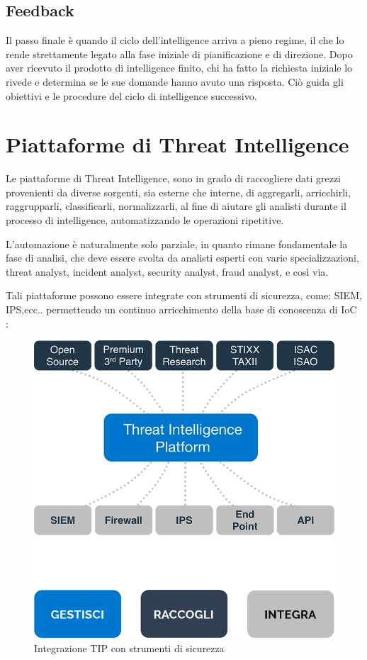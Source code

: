   
    
\subsection{Feedback}


Il passo finale è quando il ciclo dell'intelligence arriva a pieno regime, il che lo rende strettamente legato alla fase iniziale di pianificazione e di direzione. 
Dopo aver ricevuto il prodotto di intelligence finito, chi ha fatto la richiesta iniziale lo rivede e determina se le sue domande hanno avuto una risposta. 
Ciò guida gli obiettivi e le procedure del ciclo di intelligence successivo.

\section{Piattaforme di Threat Intelligence}
\label{sec:Piattaforme di Threat Intelligence}

Le piattaforme di Threat Intelligence, sono in grado di raccogliere dati grezzi provenienti da diverse sorgenti, sia esterne che interne, di aggregarli, arricchirli, raggrupparli, classificarli, normalizzarli, al fine di aiutare gli analisti durante il processo di intelligence, automatizzando le operazioni ripetitive.\par
L’automazione è naturalmente solo parziale, in quanto rimane fondamentale la fase di analisi, che deve essere svolta da analisti esperti con varie specializzazioni, threat analyst, incident analyst, security analyst, fraud analyst, e così via.

\newpage

Tali piattaforme possono essere integrate con strumenti di sicurezza, come: SIEM, IPS,ecc.. permettendo un continuo arricchimento della base di conoscenza di IoC  : 

 \begin{figure}[h]
    \begin{center}
    \includegraphics[width=0.80\columnwidth]{images/3_CTI_img/integrazioneTPISIEM.png}
    \end{center}
    \caption{Integrazione TIP con strumenti di sicurezza}
    \label{fig:Integrazione TIP con strumenti di sicurezza}
\end{figure}
    
